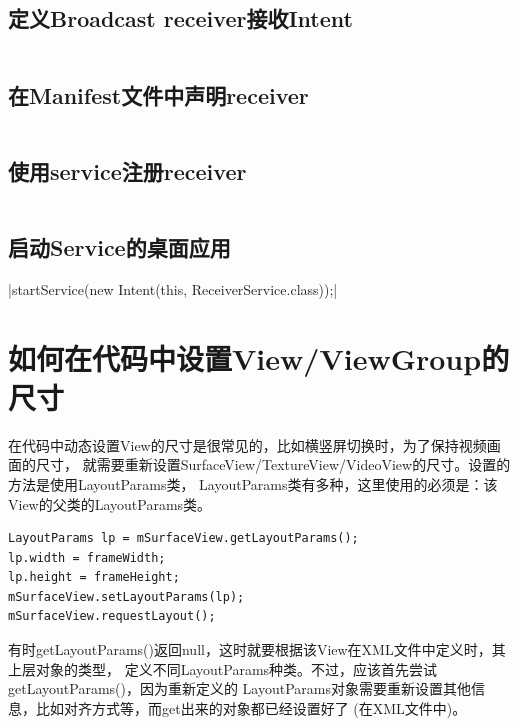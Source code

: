 ﻿\documentclass[a4paper,11pt]{article}
\begin{document}
  \subsection[定义Broadcast receiver接收Intent]{定义Broadcast receiver接收Intent}
  \inputminted[linenos,tabsize=4,bgcolor=srcbg,fontsize=\small]{java}{ScreenBroadcastReceiver.java}

  \subsection[在Manifest文件中声明receiver]{在Manifest文件中声明receiver}
  \inputminted[linenos,tabsize=4,bgcolor=srcbg]{xml}{AndroidManifest.xml}

  \subsection[使用service注册receiver]{使用service注册receiver}
  \inputminted[linenos,tabsize=4,bgcolor=srcbg]{java}{ReceiverService.java}

  \subsection[启动Service的桌面应用]{启动Service的桌面应用}
  |startService(new Intent(this, ReceiverService.class));|


  \section[如何在代码中设置View/ViewGroup的尺寸]{如何在代码中设置View/ViewGroup的尺寸}
  在代码中动态设置View的尺寸是很常见的，比如横竖屏切换时，为了保持视频画面的尺寸，
  就需要重新设置SurfaceView/TextureView/VideoView的尺寸。设置的方法是使用LayoutParams类，
  LayoutParams类有多种，这里使用的必须是：该View的父类的LayoutParams类。

\begin{verbatim}
LayoutParams lp = mSurfaceView.getLayoutParams();
lp.width = frameWidth;
lp.height = frameHeight;
mSurfaceView.setLayoutParams(lp);
mSurfaceView.requestLayout();
\end{verbatim}

  有时getLayoutParams()返回null，这时就要根据该View在XML文件中定义时，其上层对象的类型，
  定义不同LayoutParams种类。不过，应该首先尝试getLayoutParams()，因为重新定义的
  LayoutParams对象需要重新设置其他信息，比如对齐方式等，而get出来的对象都已经设置好了
  (在XML文件中)。
\end{document}
